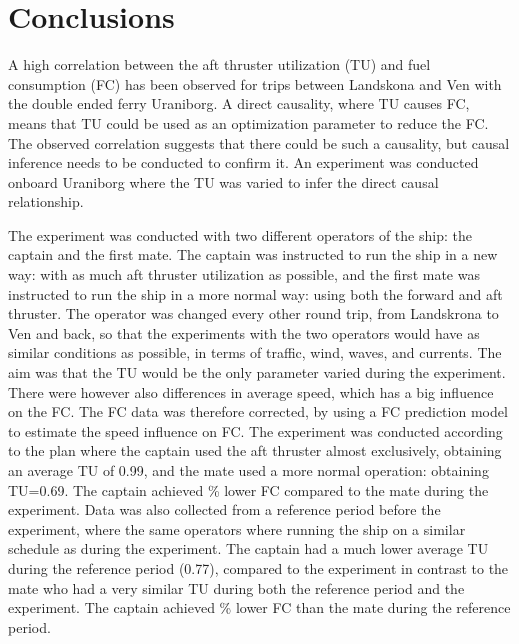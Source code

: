 \section{Conclusions}
A high correlation between the aft thruster utilization (TU) and fuel consumption (FC) has been observed for trips between Landskona and Ven with the double ended ferry Uraniborg. A direct causality, where TU causes FC, means that TU could be used as an optimization parameter to reduce the FC. The observed correlation suggests that there could be such a causality, but causal inference needs to be conducted to confirm it.
An experiment was conducted onboard Uraniborg where the TU was varied to infer the direct causal relationship.

The experiment was conducted with two different operators of the ship: the captain and the first mate. The captain was instructed to run the ship in a new way: with as much aft thruster utilization as possible, and the first mate was instructed to run the ship in a more normal way: using both the forward and aft thruster.
The operator was changed every other round trip, from Landskrona to Ven and back, so that the experiments with the two operators would have as similar conditions as possible, in terms of traffic, wind, waves, and currents.
The aim was that the TU would be the only parameter varied during the experiment. There were however also differences in average speed, which has a big influence on the FC. The FC data was therefore corrected, by using a FC prediction model to estimate the speed influence on FC.
The experiment was conducted according to the plan where the captain used the aft thruster almost exclusively, obtaining an average TU of 0.99, and the mate used a more normal operation: obtaining TU=0.69.
The captain achieved \savingpctexperiment \% lower FC compared to the mate during the experiment.
Data was also collected from a reference period before the experiment, where the same operators where running the ship on a similar schedule as during the experiment. The captain had a much lower average TU during the reference period (0.77), compared to the experiment in contrast to the mate who had a very similar TU during both the reference period and the experiment.
The captain achieved \savingpctbeforeexperiment \% lower FC than the mate during the reference period. 

